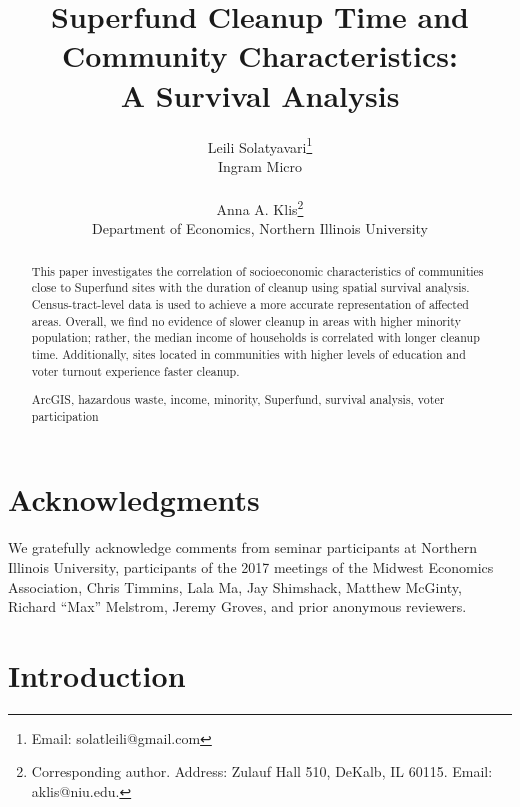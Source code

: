 \documentclass[12pt]{article}
\title{\Large Superfund Cleanup Time and Community Characteristics: \\
A Survival Analysis}
\author{\normalsize Leili Solatyavari\footnote{Email: solatleili@gmail.com} \\
\normalsize Ingram Micro \\ 
\\
\normalsize Anna A. Klis\footnote{Corresponding author. Address: Zulauf Hall 510, DeKalb, IL 60115. Email: aklis@niu.edu.} \\
\normalsize Department of Economics, Northern Illinois University \\
}
\date{ }
\begin{document}
\maketitle

\onehalfspacing

\vspace{-20pt}
\begin{abstract}
This paper investigates the correlation of socioeconomic characteristics of communities close to Superfund sites with the duration of cleanup using spatial survival analysis. Census-tract-level data is used to achieve a more accurate representation of affected areas. Overall, we find no evidence of slower cleanup in areas with higher minority population; rather, the median income of households is correlated with longer cleanup time. Additionally, sites located in communities with higher levels of education and voter turnout experience faster cleanup.

 ArcGIS, hazardous waste, income, minority, Superfund, survival analysis, voter participation

\end{abstract}

\section*{Acknowledgments}

{We gratefully acknowledge comments from seminar participants at Northern Illinois University, participants of the 2017 meetings of the Midwest Economics Association, Chris Timmins, Lala Ma, Jay Shimshack, Matthew McGinty, Richard ``Max'' Melstrom, Jeremy Groves, and prior anonymous reviewers.}



\newpage

\linenumbers
\section{Introduction}\label{intro}
\end{document}
